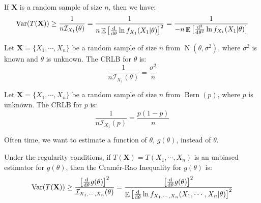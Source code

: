 \documentclass{huhtakm-template-book-v2}
\DeclareMathOperator{\E}{\mathbb{E}}
\DeclareMathOperator{\Var}{Var}
\DeclareMathOperator{\Bern}{Bern}
\DeclareMathOperator{\N}{N}
\begin{document}
\newpage
\begin{rem}
	If $\mathbf{X}$ is a random sample of size $n$, then we have:
	\begin{equation*}
		\Var(T(\mathbf{X}))\geq\frac{1}{n\mathcal{I}_{X_{1}}(\theta)}=\frac{1}{n\E\left[\odv*{\ln{f_{X_{1}}(X_{1}|\theta)}}{\theta}\right]^{2}}=\frac{1}{-n\E\left[\odv*[order={2}]{\ln{f_{X_{1}}(X_{1}|\theta)}}{\theta}\right]}
	\end{equation*}
\end{rem}
\begin{eg}
	Let $\mathbf{X}=\{X_{1},\cdots,X_{n}\}$ be a random sample of size $n$ from $\N(\theta,\sigma^{2})$, where $\sigma^{2}$ is known and $\theta$ is unknown. The CRLB for $\theta$ is:
	\begin{equation*}
		\frac{1}{n\mathcal{I}_{X_{1}}(\theta)}=\frac{\sigma^{2}}{n}
	\end{equation*}
\end{eg}
\begin{eg}
	Let $\mathbf{X}=\{X_{1},\cdots,X_{n}\}$ be a random sample of size $n$ from $\Bern(p)$, where $p$ is unknown. The CRLB for $p$ is:
	\begin{equation*}
		\frac{1}{n\mathcal{I}_{X_{1}}(p)}=\frac{p(1-p)}{n}
	\end{equation*}
\end{eg}
Often time, we want to estimate a function of $\theta$, $g(\theta)$, instead of $\theta$.
\begin{thm}
	Under the regularity conditions, if $T(\mathbf{X})=T(X_{1},\cdots,X_{n})$ is an unbiased estimator for $g(\theta)$, then the Cram\'er-Rao Inequality for $g(\theta)$ is:
	\begin{equation*}
		\Var(T(\mathbf{X}))\geq\frac{\left[\odv*{g(\theta)}{\theta}\right]^{2}}{\mathcal{I}_{X_{1},\cdots,X_{n}}(\theta)}=\frac{\left[\odv*{g(\theta)}{\theta}\right]^{2}}{\E\left[\odv*{\ln{f_{X_{1},\cdots,X_{n}}(X_{1},\cdots,X_{n}|\theta)}}{\theta}\right]^{2}}
	\end{equation*}
\end{thm}
\end{document}
